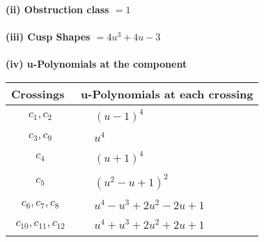 \documentclass[1p]{elsarticle_modified}
\theoremstyle{definition}
\begin{document}
\flushleft \textbf{(ii) Obstruction class $= 1$}\\~\\
\flushleft \textbf{(iii) Cusp Shapes $= 4 u^3+4 u-3$}\\~\\
\newpage\renewcommand{\arraystretch}{1}
\flushleft \textbf{(iv) u-Polynomials at the component}\newline \\
\begin{tabular}{m{50pt}|m{274pt}}
Crossings & \hspace{64pt}u-Polynomials at each crossing \\
\hline $$\begin{aligned}c_{1},c_{2}\end{aligned}$$&$\begin{aligned}
&(u-1)^4
\end{aligned}$\\
\hline $$\begin{aligned}c_{3},c_{9}\end{aligned}$$&$\begin{aligned}
&u^4
\end{aligned}$\\
\hline $$\begin{aligned}c_{4}\end{aligned}$$&$\begin{aligned}
&(u+1)^4
\end{aligned}$\\
\hline $$\begin{aligned}c_{5}\end{aligned}$$&$\begin{aligned}
&(u^2- u+1)^2
\end{aligned}$\\
\hline $$\begin{aligned}c_{6},c_{7},c_{8}\end{aligned}$$&$\begin{aligned}
&u^4- u^3+2 u^2-2 u+1
\end{aligned}$\\
\hline $$\begin{aligned}c_{10},c_{11},c_{12}\end{aligned}$$&$\begin{aligned}
&u^4+u^3+2 u^2+2 u+1
\end{aligned}$\\
\hline
\end{tabular}\\~\\
\end{document}
